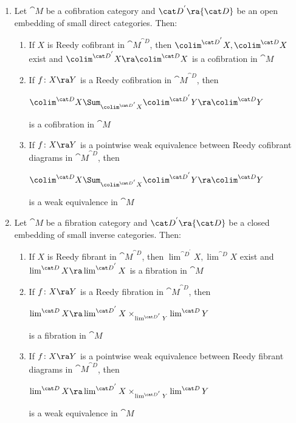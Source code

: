 \begin{thm}
\label{thm:colimdirectemb}
\mbox{}
\begin{enumerate}
\item
Let ${\cat M}$ be a cofibration category and ${\cat D}^{'} \ra {\cat D}$ be an open embedding of small direct categories. Then:
\begin{enumerate}
\item
If $X$ is Reedy cofibrant in ${\cat M}^{\cat D}$, then $\colim^{{\cat D}^{'}} X, \colim^{\cat D} X$ exist and $\colim^{{\cat D}^{'}} X \ra \colim^{\cat D} X$ is a cofibration in ${\cat M}$
\item
If $f \colon X \ra Y$ is a Reedy cofibration in ${\cat M}^{\cat D}$, then 
\begin{center}
$\colim^{\cat D} X \Sum_{\colim^{{\cat D}^{'}} X} \colim^{{\cat D}^{'}} Y \ra \colim^{\cat D} Y$ 
\end{center}
is a cofibration in ${\cat M}$
\item
If $f \colon X \ra Y$ is a pointwise weak equivalence between Reedy cofibrant diagrams in ${\cat M}^{\cat D}$, then 
\begin{center}
$\colim^{\cat D} X \Sum_{\colim^{{\cat D}^{'}} X} \colim^{{\cat D}^{'}} Y \ra \colim^{\cat D} Y$ 
\end{center}
is a weak equivalence in ${\cat M}$
\end{enumerate}
\item
Let ${\cat M}$ be a fibration category and  ${\cat D}^{'} \ra {\cat D}$ be a closed embedding of small inverse categories. Then:
\begin{enumerate}
\item
If $X$ is Reedy fibrant in ${\cat M}^{\cat D}$, then $\lim^{{\cat D}^{'}} X, \lim^{\cat D} X$ exist and $\lim^{{\cat D}} X \ra \lim^{{\cat D}^{'}} X$ is a fibration in ${\cat M}$
\item
If $f \colon X \ra Y$ is a Reedy fibration in ${\cat M}^{\cat D}$, then 
\begin{center}
$\lim^{{\cat D}} X \ra \lim^{{\cat D}^{'}} X \times_{\lim^{{\cat D}^{'}} Y} \lim^{{\cat D}} Y $ 
\end{center}
is a fibration in ${\cat M}$
\item
If $f \colon X \ra Y$ is a pointwise weak equivalence between Reedy fibrant diagrams in ${\cat M}^{\cat D}$, then 
\begin{center}
$\lim^{{\cat D}} X \ra \lim^{{\cat D}^{'}} X \times_{\lim^{{\cat D}^{'}} Y} \lim^{{\cat D}} Y $ 
\end{center}
is a weak equivalence in ${\cat M}$
\end{enumerate}
\end{enumerate}
\end{thm}

